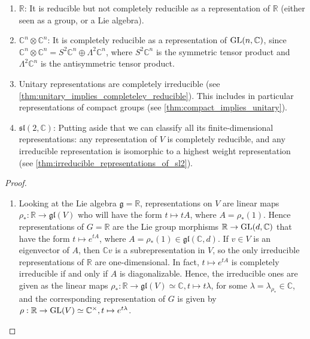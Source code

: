 \documentclass{report}
\begin{document}
\begin{example}
    \begin{enumerate}[label = (\roman*)]
        \item $\mathbb R$: It is reducible but not completely reducible as a representation of $\mathbb R$ (either seen as a group, or a Lie algebra).
        \item $\mathbb C^n \otimes \mathbb C^n$: It is completely reducible as a representation of $\operatorname{{\mathrm{GL}}}(n, \mathbb C)$, since $\mathbb C^n \otimes \mathbb C^n = S^2 \mathbb C^n \oplus \Lambda^2 \mathbb C^n$, where $S^2 \mathbb C^n$ is the symmetric tensor product and $\Lambda^2 \mathbb C^n$ is the antisymmetric tensor product.
        \item Unitary representations are completely irreducible (see \cref{thm:unitary_implies_completeley_reducible}).
        This includes in particular representations of compact groups (see \cref{thm:compact_implies_unitary}).
        \item $\mathfrak{sl}(2, \mathbb C)$: Putting aside that we can classify all its finite-dimensional representations: any representation of $V$ is completely reducible, and any irreducible representation is isomorphic to a highest weight representation (see \cref{thm:irreducible_representations_of_sl2}).
    \end{enumerate}
\end{example}
\begin{proof}
    \begin{enumerate}[label = (\roman*)]
        \item\label{ex:R_not_completely_irreducible} 
        Looking at the Lie algebra $\mathfrak g = \mathbb R$, representations on $V$ are linear maps $\rho_*: \mathbb R \to \mathfrak{gl}(V)$ who will have the form $t \mapsto t A$, where $A = \rho_*(1)$. 
        Hence representations of $G = \mathbb R$ are the Lie group morphisms $\mathbb R \to \operatorname{{\mathrm{GL}}}(d, \mathbb C)$ that have the form $t \mapsto e^{tA}$, where $A = \rho_*(1) \in \mathfrak{gl}(\mathbb C, d)$.
        If $v \in V$ is an eigenvector of $A$, then $\mathbb Cv$ is a subrepresentation in $V$, so the only irreducible representations of $\mathbb R$ are one-dimensional.
        In fact, $t \mapsto e^{tA}$ is completely irreducible if and only if $A$ is diagonalizable.
        Hence, the irreducible ones are given as the linear maps $\rho_*: \mathbb R \to \mathfrak{gl}(V) \simeq \mathbb C, t \mapsto t \lambda$, for some $\lambda = \lambda_{\rho_*} \in \mathbb C$, and the corresponding representation of $G$ is given by $\rho: \mathbb R \to \operatorname{{\mathrm{GL}}}(V) \simeq \mathbb C^{\times}, t \mapsto e^{t \lambda}$.
    \end{enumerate}
\end{proof}
\end{document}
